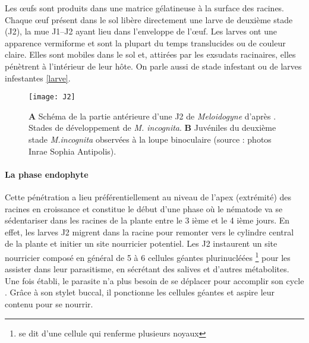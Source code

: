 	Les œufs sont produits dans une matrice gélatineuse à la surface des racines.  Chaque œuf présent dans le sol libère directement une larve de deuxième stade (J2),  la  mue J1--J2 ayant lieu dans
l’enveloppe de l’œuf. Les larves ont une apparence vermiforme et sont la plupart du temps translucides ou de couleur claire. Elles sont mobiles dans le sol et, attirées par les
exsudats racinaires, elles pénètrent à l’intérieur de leur hôte. On parle aussi de stade infestant ou de larves infestantes \autoref{larve}.

	\begin{figure}
	  \centering
		  \texttt{[image: J2]}
		  \caption[Larve de deuxième stade de \textit{M. incognita}]{\textbf{A}  Schéma de la partie antérieure d’une   
		          J2 de \textit{Meloidogyne} d’après \citet{Vanholme2004}.
		           Stades de développement  de \textit{M. incognita}. \textbf{B} Juvéniles du deuxième stade  
		           \textit{M.incognita} observées à la loupe binoculaire (source : photos Inrae Sophia Antipolis).}
		 \label{larve}
	\end{figure}

\paragraph{La phase endophyte}
Cette pénétration a lieu préférentiellement au niveau de l’apex (extrémité) des racines en croissance et constitue le début d'une phase où le nématode va se sédentariser dans les racines de la plante entre le 3 ième et le 4 ième jours. En effet,  les larves J2 migrent dans la racine pour remonter vers le cylindre central de la plante et initier un site nourricier potentiel. Les J2 instaurent un site nourricier composé en général de 5 à 6 cellules géantes plurinucléées \footnote{se dit d'une cellule qui renferme plusieurs noyaux}  pour les assister dans leur parasitisme, en sécrétant des salives  et d’autres métabolites. 
Une fois établi, le parasite n'a plus besoin de se déplacer pour accomplir son cycle \citep{Abad2010}. Grâce à son stylet buccal, il ponctionne les cellules géantes et aspire leur contenu pour se nourrir.
		
